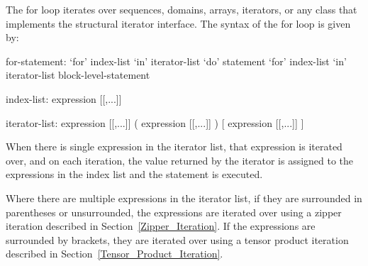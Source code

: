 The for loop iterates over sequences, domains, arrays, iterators, or
any class that implements the structural iterator interface.  The
syntax of the for loop is given by:
\begin{syntax}
for-statement:
  `for' index-list `in' iterator-list `do' statement
  `for' index-list `in' iterator-list block-level-statement

index-list:
  expression [[,...]]

iterator-list:
  expression [[,...]]
  ( expression [[,...]] )
  [ expression [[,...]] ]
\end{syntax}

When there is single expression in the iterator list, that expression
is iterated over, and on each iteration, the value returned by the
iterator is assigned to the expressions in the index list and the
statement is executed.

Where there are multiple expressions in the iterator list, if they are
surrounded in parentheses or unsurrounded, the expressions are
iterated over using a zipper iteration described in
Section~\ref{Zipper_Iteration}.  If the expressions are surrounded by
brackets, they are iterated over using a tensor product iteration
described in Section~\ref{Tensor_Product_Iteration}.
